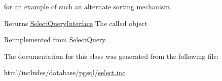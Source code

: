 for an example of such an alternate sorting mechanism.

\begin{DoxyReturn}{Returns}
\hyperlink{interfaceSelectQueryInterface}{SelectQueryInterface} The called object 
\end{DoxyReturn}


Reimplemented from \hyperlink{classSelectQuery_af284bacf9e56ccf177d17f4b4bc84b03}{SelectQuery}.

The documentation for this class was generated from the following file:\begin{DoxyCompactItemize}
\item 
html/includes/database/pgsql/\hyperlink{pgsql_2select_8inc}{select.inc}\end{DoxyCompactItemize}
